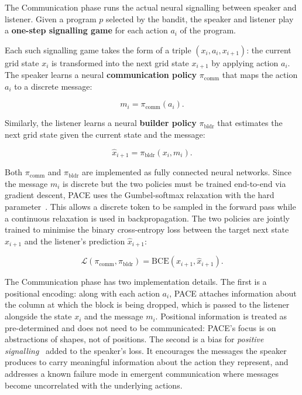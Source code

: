 The Communication phase runs the actual neural signalling between speaker and listener. Given a program $p$ selected by the bandit, the speaker and listener play a \textbf{one-step signalling game} for each action $a_i$ of the program.

Each such signalling game takes the form of a triple $(x_i, a_i, x_{i+1})$: the current grid state $x_i$ is transformed into the next grid state $x_{i+1}$ by applying action $a_i$. The speaker learns a neural \textbf{communication policy} $\pi_{\text{comm}}$ that maps the action $a_i$ to a discrete message:

\begin{equation}
    m_i = \pi_{\text{comm}}(a_i).
    \label{eq:pace-speaker}
\end{equation}

Similarly, the listener learns a neural \textbf{builder policy} $\pi_{\text{bldr}}$ that estimates the next grid state given the current state and the message:

\begin{equation}
    \widehat{x}_{i+1} = \pi_{\text{bldr}}(x_i, m_i).
    \label{eq:pace-listener}
\end{equation}

Both $\pi_{\text{comm}}$ and $\pi_{\text{bldr}}$ are implemented as fully connected neural networks. Since the message $m_i$ is discrete but the two policies must be trained end-to-end via gradient descent, PACE uses the Gumbel-softmax relaxation with the hard parameter~\cite{jang_categorical_2017}. This allows a discrete token to be sampled in the forward pass while a continuous relaxation is used in backpropagation. The two policies are jointly trained to minimise the binary cross-entropy loss between the target next state $x_{i+1}$ and the listener's prediction $\widehat{x}_{i+1}$:

\begin{equation}
    \mathcal{L}(\pi_{\text{comm}}, \pi_{\text{bldr}}) = \text{BCE}(x_{i+1}, \widehat{x}_{i+1}).
    \label{eq:pace-loss}
\end{equation}

The Communication phase has two implementation details. The first is a positional encoding: along with each action $a_i$, PACE attaches information about the column at which the block is being dropped, which is passed to the listener alongside the state $x_i$ and the message $m_i$. Positional information is treated as pre-determined and does not need to be communicated: PACE's focus is on abstractions of shapes, not of positions. The second is a bias for \textit{positive signalling}~\cite{eccles_biases_2019} added to the speaker's loss. It encourages the messages the speaker produces to carry meaningful information about the action they represent, and addresses a known failure mode in emergent communication where messages become uncorrelated with the underlying actions.

